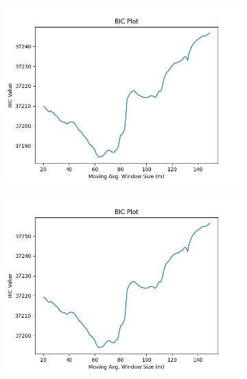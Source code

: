 \documentclass[12pt]{article}
\begin{document}
\begin{figure}[!ht]
  \begin{subfigure}[!ht]{0.45\textwidth}
    \includegraphics[width=\linewidth]{Prop_LT}
  \end{subfigure}\hfill
  \begin{subfigure}[!ht]{0.45\textwidth}
    \includegraphics[width=\linewidth]{LT}
  \end{subfigure}


\end{figure}
\end{document}
